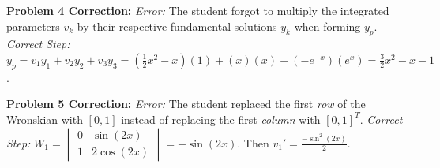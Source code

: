 \documentclass[12pt]{article}
\begin{document}
\textbf{Problem 4 Correction:}
\textit{Error:} The student forgot to multiply the integrated parameters $v_k$ by their respective fundamental solutions $y_k$ when forming $y_p$.
\textit{Correct Step:} $y_p = v_1 y_1 + v_2 y_2 + v_3 y_3 = (\frac{1}{2}x^2 - x)(1) + (x)(x) + (-e^{-x})(e^x) = \frac{3}{2}x^2 - x - 1$.

\textbf{Problem 5 Correction:}
\textit{Error:} The student replaced the first \textit{row} of the Wronskian with $[0, 1]$ instead of replacing the first \textit{column} with $[0, 1]^T$.
\textit{Correct Step:} $W_1 = \begin{vmatrix} 0 & \sin(2x) \\ 1 & 2\cos(2x) \end{vmatrix} = -\sin(2x)$. Then $v_1' = \frac{-\sin^2(2x)}{2}$.
\end{document}
